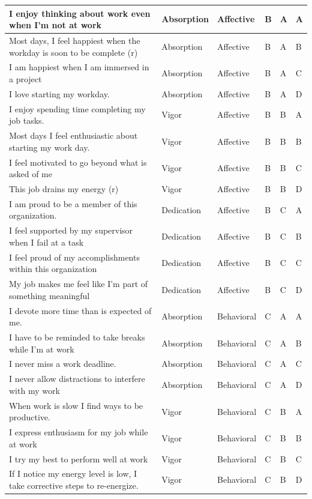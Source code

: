 \documentclass[
]{book}
\begin{document}
\begin{table}
\begin{tabular}[t]{l|l|l|l|l|l}
\hline
I enjoy thinking about work even when I’m not at work & Absorption & Affective & B & A & A\\
\hline
Most days, I feel happiest when the workday is soon to be complete (r) & Absorption & Affective & B & A & B\\
\hline
I am happiest when I am immersed in a project & Absorption & Affective & B & A & C\\
\hline
I love starting my workday. & Absorption & Affective & B & A & D\\
\hline
I enjoy spending time completing my job tasks. & Vigor & Affective & B & B & A\\
\hline
Most days I feel enthusiastic about starting my work day. & Vigor & Affective & B & B & B\\
\hline
I feel motivated to go beyond what is asked of me & Vigor & Affective & B & B & C\\
\hline
This job drains my energy (r) & Vigor & Affective & B & B & D\\
\hline
I am proud to be a member of this organization. & Dedication & Affective & B & C & A\\
\hline
I feel supported by my supervisor when I fail at a task & Dedication & Affective & B & C & B\\
\hline
I feel proud of my accomplishments within this organization & Dedication & Affective & B & C & C\\
\hline
My job makes me feel like I’m part of something meaningful & Dedication & Affective & B & C & D\\
\hline
I devote more time than is expected of me. & Absorption & Behavioral & C & A & A\\
\hline
I have to be reminded to take breaks while I’m at work & Absorption & Behavioral & C & A & B\\
\hline
I never miss a work deadline. & Absorption & Behavioral & C & A & C\\
\hline
I never allow distractions to interfere with my work & Absorption & Behavioral & C & A & D\\
\hline
When work is slow I find ways to be productive. & Vigor & Behavioral & C & B & A\\
\hline
I express enthusiasm for my job while at work & Vigor & Behavioral & C & B & B\\
\hline
I try my best to perform well at work & Vigor & Behavioral & C & B & C\\
\hline
If I notice my energy level is low, I take corrective steps to re-energize. & Vigor & Behavioral & C & B & D\\

\end{tabular}
\end{table}
\end{document}
